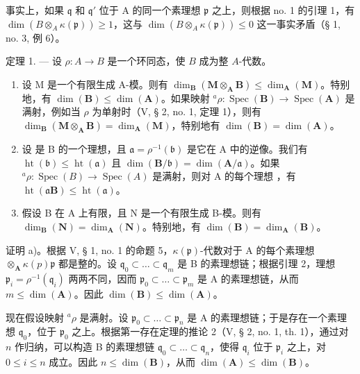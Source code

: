 事实上，如果 \(\mathfrak{q}\) 和 \(\mathfrak{q}'\) 位于 A 的同一个素理想 \(\mathfrak{p}\) 之上，则根据 no. 1 的引理 1，有 \(\dim(B \otimes_{A} \kappa(\mathfrak{p})) \geqslant 1\)，这与 \(\dim(B \otimes_{A} \kappa(\mathfrak{p})) \leqslant 0\) 这一事实矛盾（§ 1, no. 3, 例 6）。

定理 1. --- 设 \(\rho: A \to B\) 是一个环同态，使 \(B\) 成为整 \(A\)-代数。

\begin{enumerate}
\def\labelenumi{\alph{enumi})}
\item
  设 M 是一个有限生成 A-模。则有 \(\dim_{\mathbf{B}}(\mathbf{M} \otimes_{\mathbf{A}} \mathbf{B}) \leqslant \dim_{\mathbf{A}}(\mathbf{M})\)。特别地，有 \(\dim(\mathbf{B}) \leqslant \dim(\mathbf{A})\)。如果映射 \({}^{a}\rho: \operatorname{Spec}(\mathbf{B}) \to \operatorname{Spec}(\mathbf{A})\) 是满射，例如当 \(\rho\) 为单射时（V, § 2, no. 1, 定理 1），则有 \(\dim_{\mathbf{B}}(\mathbf{M} \otimes_{\mathbf{A}} \mathbf{B}) = \dim_{\mathbf{A}}(\mathbf{M})\)，特别地有 \(\dim(\mathbf{B}) = \dim(\mathbf{A})\)。
\item
  设  是 B 的一个理想，且 \(\mathfrak{a} = \rho^{-1}(\mathfrak{b})\) 是它在 A 中的逆像。我们有 \(\operatorname{ht}(\mathfrak{b}) \leqslant \operatorname{ht}(\mathfrak{a})\) 且 \(\dim(\mathbf{B}/\mathfrak{b}) = \dim(\mathbf{A}/\mathfrak{a})\)。如果 \({}^{a}\rho : \operatorname{Spec}(B) \to \operatorname{Spec}(A)\) 是满射，则对 A 的每个理想  ，有 \(\operatorname{ht}(\mathfrak{a}\mathbf{B}) \leqslant \operatorname{ht}(\mathfrak{a})\)。
\item
  假设 B 在 A 上有限，且 N 是一个有限生成 B-模。则有 \(\dim_{\mathbf{B}}(\mathbf{N}) = \dim_{\mathbf{A}}(\mathbf{N})\)。特别地，有 \(\dim(\mathbf{B}) = \dim_{\mathbf{A}}(\mathbf{B})\)。
\end{enumerate}

证明 a)。根据 V, § 1, no. 1 的命题 5，\(\kappa(\mathfrak{p})\)-代数对于 A 的每个素理想 \(\otimes_{\mathbf{A}} \kappa(p)\)\(\mathfrak{p}\) 都是整的。设 \(\mathfrak{q}_0 \subset \ldots \subset \mathfrak{q}_m\) 是 B 的素理想链；根据引理 2，理想 \(\mathfrak{p}_i = \rho^{-1}(\mathfrak{q}_i)\) 两两不同，因而 \(\mathfrak{p}_0 \subset \ldots \subset \mathfrak{p}_m\) 是 A 的素理想链，从而 \(m \leqslant \dim(\mathbf{A})\)。因此 \(\dim(\mathbf{B}) \leqslant \dim(\mathbf{A})\)。

现在假设映射 \({}^{a}\rho\) 是满射。设 \(\mathfrak{p}_0 \subset \ldots \subset \mathfrak{p}_n\) 是 A 的素理想链；于是存在一个素理想 \(\mathfrak{q}_0\)，位于 \(\mathfrak{p}_0\) 之上。根据第一存在定理的推论 2（V, § 2, no. 1, th. 1），通过对 \(n\) 作归纳，可以构造 B 的素理想链 \(\mathfrak{q}_0 \subset \ldots \subset \mathfrak{q}_n\)，使得 \(\mathfrak{q}_i\) 位于 \(\mathfrak{p}_i\) 之上，对 \(0 \leqslant i \leqslant n\) 成立。因此 \(n \leqslant \dim(\mathbf{B})\)，从而 \(\dim(\mathbf{A}) \leqslant \dim(\mathbf{B})\)。

